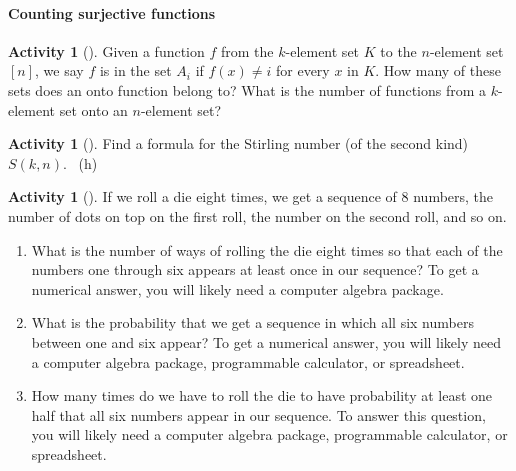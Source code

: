 \documentclass[10pt,]{book}
\theoremstyle{plain}
\theoremstyle{definition}
\theoremstyle{definition}
\theoremstyle{definition}
\newtheorem{activity}[project]{Activity}
\numberwithin{equation}{chapter}
\begin{document}
\paragraph[{Counting surjective functions}]{Counting surjective functions}\hypertarget{paragraphs-7}{}
\begin{activity}[]\label{numontofun}
\hypertarget{p-1226}{}%
Given a function \(f\) from the \(k\)-element set \(K\) to the \(n\)-element set \([n]\), we say \(f\) is in the set \(A_i\) if \(f(x)\not= i\) for every \(x\) in \(K\). How many of these  sets does an onto function belong to? What is the number of functions from a \(k\)-element set onto an \(n\)-element set?%
\end{activity}
\begin{activity}[]\label{act_stirlingpie}
\hypertarget{p-1228}{}%
Find a formula for the Stirling number (of the second kind) \(S(k,n)\).%
~{\tiny (h)}\end{activity}
\begin{activity}[]\label{activity-225}
\hypertarget{p-1231}{}%
If we roll a die eight times, we get a sequence of 8 numbers, the number of dots on top on the first roll, the number on the second roll, and so on.%
\begin{enumerate}[font=\bfseries,label=(\alph*),ref=\alph*]
\item\label{task-230} \hypertarget{p-1232}{}%
What is the number of ways of rolling the die eight times so that each of the numbers one through six appears at least once in our sequence? To get a numerical answer, you will likely need a computer algebra package.%
\item\label{task-231} \hypertarget{p-1234}{}%
What is the probability that we get a sequence in which all six numbers between one and six appear? To get a numerical answer, you will likely need a computer algebra package, programmable calculator, or spreadsheet.%
\item\label{task-232} \hypertarget{p-1236}{}%
How many times do we have to roll the die to have probability at least one half that all six numbers appear in our sequence. To answer this question, you will likely need a computer algebra package, programmable calculator, or spreadsheet.%
\end{enumerate}
\end{activity}
\typeout{************************************************}
\typeout{************************************************}
\end{document}
